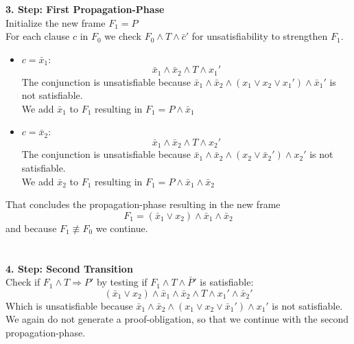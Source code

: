 \documentclass[11pt, a4paper, BCOR=10mm, ngerman, oneside]{scrbook}
\begin{document}
\textbf{3. Step: First Propagation-Phase} \\ Initialize the new frame $F_1 = P$ \\
For each clause $c$ in $F_0$ we check $F_0 \land T \land \bar c'$ for unsatisfiability to strengthen $F_1$.
\begin{itemize}
\item $c = \bar x_1:$
\begin{equation*}
\bar x_1 \land \bar x_2 \land T \land x_1'
\end{equation*}
The conjunction is unsatisfiable because $\bar x_1 \land \bar x_2 \land (x_1 \lor x_2 \lor x_1') \land \bar x_1'$ is not satisfiable.\\ We add $\bar x_1$ to $F_1$ resulting in $F_1 = P \land \bar x_1$ \\

\item$c = \bar x_2:$
\begin{equation*}
\bar x_1 \land \bar x_2 \land T \land x_2'
\end{equation*}
The conjunction is unsatisfiable because $\bar x_1 \land \bar x_2 \land (x_2 \lor \bar x_2') \land x_2'$ is not satisfiable. \\ We add $\bar x_2$ to $F_1$ resulting in $F_1 = P \land \bar x_1 \land \bar x_2$
\end{itemize}
That concludes the propagation-phase resulting in the new frame
\begin{equation*}
F_1 =(\bar x_1 \lor x_2) \land \bar x_1 \land \bar x_2
\end{equation*}
and because $F_1 \not\equiv F_0$ we continue. \\ \\ \\

\textbf{4. Step: Second Transition} \\
Check if $F_1 \land T \Rightarrow P'$ by testing if $F_1 \land T \land \bar P'$ is satisfiable: 
\begin{equation*}
(\bar x_1 \lor x_2) \land \bar x_1 \land \bar x_2 \land T \land x_1' \land \bar x_2'
\end{equation*}
Which is unsatisfiable because $\bar x_1 \land \bar x_2 \land (x_1 \lor x_2 \lor \bar x_1') \land x_1'$ is not satisfiable. We again do not generate a proof-obligation, so that we continue with the second propagation-phase. \\ \\ \par
\end{document}

